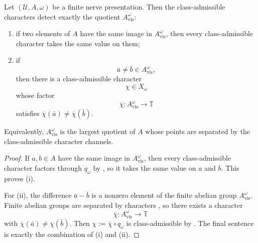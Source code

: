 \begin{corollary}\label{cor:intrinsic-character-detection}
Let $(\mathcal U,A,\omega)$ be a finite nerve presentation. Then the
class-admissible characters detect exactly the quotient
$A_{\mathrm{vis}}^{\omega}$:
\begin{enumerate}[label=(\roman*),nosep]
\item if two elements of $A$ have the same image in $A_{\mathrm{vis}}^{\omega}$,
then every class-admissible character takes the same value on them;
\item if
\[
\bar a\neq \bar b\in A_{\mathrm{vis}}^{\omega},
\]
then there is a class-admissible character
\[
\chi\in X_{\omega}
\]
whose factor
\[
\overline\chi:A_{\mathrm{vis}}^{\omega}\to\mathbb T
\]
satisfies $\overline\chi(\bar a)\neq \overline\chi(\bar b)$.
\end{enumerate}
Equivalently, $A_{\mathrm{vis}}^{\omega}$ is the largest quotient of $A$ whose
points are separated by the class-admissible character channels.
\end{corollary}

\begin{proof}
If $a,b\in A$ have the same image in $A_{\mathrm{vis}}^{\omega}$, then every
class-admissible character factors through $q_{\omega}$ by
, so it takes the same value on $a$ and
$b$. This proves \textup{(i)}.

For \textup{(ii)}, the difference $\bar a-\bar b$ is a nonzero element of the
finite abelian group $A_{\mathrm{vis}}^{\omega}$. Finite abelian groups are
separated by characters \cite[Chap.~2]{Terras1999}, so there exists a
character
\[
\overline\chi:A_{\mathrm{vis}}^{\omega}\to\mathbb T
\]
with $\overline\chi(\bar a)\neq \overline\chi(\bar b)$. Then
$\chi:=\overline\chi\circ q_{\omega}$ is class-admissible by
. The final sentence is exactly the
combination of \textup{(i)} and \textup{(ii)}.
\end{proof}

